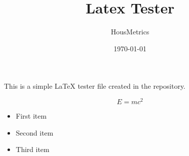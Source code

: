 \documentclass{article}
\title{Latex Tester}
\author{HousMetrics}
\date{\today}
\begin{document}
\maketitle

This is a simple LaTeX tester file created in the repository.

\begin{equation}
E = mc^2
\end{equation}

\begin{itemize}
  \item First item
  \item Second item
  \item Third item
\end{itemize}
\end{document}
